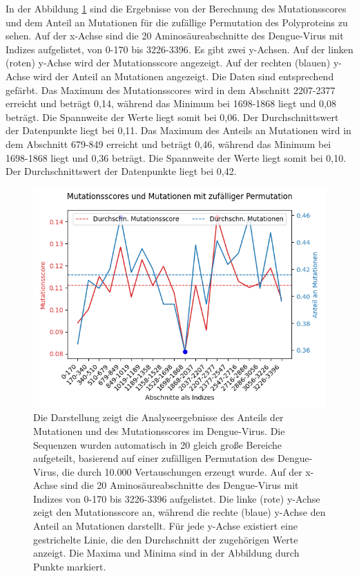 \documentclass[german,version-2022-01]{uzl-thesis}
\begin{document}
In der Abbildung \ref{fig:Dengue_virus_scores_and_mutations_bereiche_random} sind die Ergebnisse von der Berechnung des Mutationsscores und dem Anteil an Mutationen f\"ur die zuf\"allige Permutation des Polyproteins zu sehen. Auf der x-Achse sind die 20 Aminos\"aureabschnitte des Dengue-Virus mit Indizes aufgelistet, von 0-170 bis 3226-3396. Es gibt zwei y-Achsen. Auf der linken (roten) y-Achse wird der Mutationsscore angezeigt. Auf der rechten (blauen) y-Achse wird der Anteil an Mutationen angezeigt. Die Daten sind entsprechend gef\"arbt. Das Maximum des Mutationsscores wird in dem Abschnitt 2207-2377 erreicht und betr\"agt 0,14, w\"ahrend das Minimum bei 1698-1868 liegt und 0,08 betr\"agt. Die Spannweite der Werte liegt somit bei 0,06. Der Durchschnittswert der Datenpunkte liegt bei 0,11. Das Maximum des Anteils an Mutationen wird in dem Abschnitt 679-849 erreicht und betr\"agt 0,46, w\"ahrend das Minimum bei 1698-1868 liegt und 0,36 betr\"agt. Die Spannweite der Werte liegt somit bei 0,10. Der Durchschnittswert der Datenpunkte liegt bei 0,42.
\begin{figure}[tbp]
  \centering
  \includegraphics[scale=0.65]{Images/Diagramm_Scores_und_Mutationen_Dengue_viren_Bereiche_random.png}
  \caption{Die Darstellung zeigt die Analyseergebnisse des Anteils der Mutationen und des Mutationsscores im Dengue-Virus. Die Sequenzen wurden automatisch in 20 gleich gro\ss{}e Bereiche aufgeteilt, basierend auf einer zuf\"alligen Permutation des Dengue-Virus, die durch 10.000 Vertauschungen erzeugt wurde. Auf der x-Achse sind die 20 Aminos\"aureabschnitte des Dengue-Virus mit Indizes von 0-170 bis 3226-3396 aufgelistet. Die linke (rote) y-Achse zeigt den Mutationsscore an, w\"ahrend die rechte (blaue) y-Achse den Anteil an Mutationen darstellt. F\"ur jede y-Achse existiert eine gestrichelte Linie, die den Durchschnitt der zugeh\"origen Werte anzeigt. Die Maxima und Minima sind in der Abbildung durch Punkte markiert.}
  \label{fig:Dengue_virus_scores_and_mutations_bereiche_random}
\end{figure}
\end{document}
